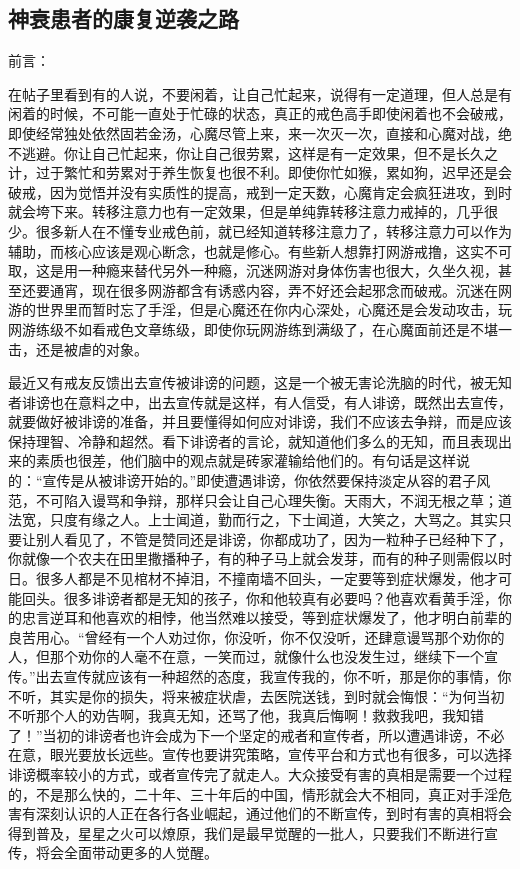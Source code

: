 \subsection{神衰患者的康复逆袭之路}

前言：

在帖子里看到有的人说，不要闲着，让自己忙起来，说得有一定道理，但人总是有闲着的时候，不可能一直处于忙碌的状态，真正的戒色高手即使闲着也不会破戒，即使经常独处依然固若金汤，心魔尽管上来，来一次灭一次，直接和心魔对战，绝不逃避。你让自己忙起来，你让自己很劳累，这样是有一定效果，但不是长久之计，过于繁忙和劳累对于养生恢复也很不利。即使你忙如猴，累如狗，迟早还是会破戒，因为觉悟并没有实质性的提高，戒到一定天数，心魔肯定会疯狂进攻，到时就会垮下来。转移注意力也有一定效果，但是单纯靠转移注意力戒掉的，几乎很少。很多新人在不懂专业戒色前，就已经知道转移注意力了，转移注意力可以作为辅助，而核心应该是观心断念，也就是修心。有些新人想靠打网游戒撸，这实不可取，这是用一种瘾来替代另外一种瘾，沉迷网游对身体伤害也很大，久坐久视，甚至还要通宵，现在很多网游都含有诱惑内容，弄不好还会起邪念而破戒。沉迷在网游的世界里而暂时忘了手淫，但是心魔还在你内心深处，心魔还是会发动攻击，玩网游练级不如看戒色文章练级，即使你玩网游练到满级了，在心魔面前还是不堪一击，还是被虐的对象。

最近又有戒友反馈出去宣传被诽谤的问题，这是一个被无害论洗脑的时代，被无知者诽谤也在意料之中，出去宣传就是这样，有人信受，有人诽谤，既然出去宣传，就要做好被诽谤的准备，并且要懂得如何应对诽谤，我们不应该去争辩，而是应该保持理智、冷静和超然。看下诽谤者的言论，就知道他们多么的无知，而且表现出来的素质也很差，他们脑中的观点就是砖家灌输给他们的。有句话是这样说的：“宣传是从被诽谤开始的。”即使遭遇诽谤，你依然要保持淡定从容的君子风范，不可陷入谩骂和争辩，那样只会让自己心理失衡。天雨大，不润无根之草；道法宽，只度有缘之人。上士闻道，勤而行之，下士闻道，大笑之，大骂之。其实只要让别人看见了，不管是赞同还是诽谤，你都成功了，因为一粒种子已经种下了，你就像一个农夫在田里撒播种子，有的种子马上就会发芽，而有的种子则需假以时日。很多人都是不见棺材不掉泪，不撞南墙不回头，一定要等到症状爆发，他才可能回头。很多诽谤者都是无知的孩子，你和他较真有必要吗？他喜欢看黄手淫，你的忠言逆耳和他喜欢的相悖，他当然难以接受，等到症状爆发了，他才明白前辈的良苦用心。“曾经有一个人劝过你，你没听，你不仅没听，还肆意谩骂那个劝你的人，但那个劝你的人毫不在意，一笑而过，就像什么也没发生过，继续下一个宣传。”出去宣传就应该有一种超然的态度，我宣传我的，你不听，那是你的事情，你不听，其实是你的损失，将来被症状虐，去医院送钱，到时就会悔恨：“为何当初不听那个人的劝告啊，我真无知，还骂了他，我真后悔啊！救救我吧，我知错了！”当初的诽谤者也许会成为下一个坚定的戒者和宣传者，所以遭遇诽谤，不必在意，眼光要放长远些。宣传也要讲究策略，宣传平台和方式也有很多，可以选择诽谤概率较小的方式，或者宣传完了就走人。大众接受有害的真相是需要一个过程的，不是那么快的，二十年、三十年后的中国，情形就会大不相同，真正对手淫危害有深刻认识的人正在各行各业崛起，通过他们的不断宣传，到时有害的真相将会得到普及，星星之火可以燎原，我们是最早觉醒的一批人，只要我们不断进行宣传，将会全面带动更多的人觉醒。

